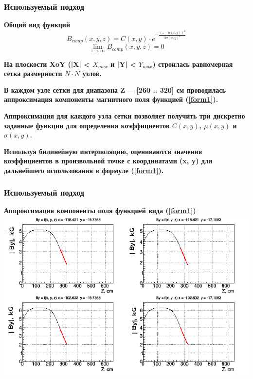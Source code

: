 \documentclass[svgnames] {beamer}
\begin{document}
\begin{frame}
  \frametitle{Используемый подход}
  \begin{block}{\centering \bf Общий вид функций}
    \begin{equation}
      B_{comp}(x, y, z) = C(x, y) \cdot e^{-\frac{(z - \mu(x,y))^{2}}{2 \sigma(x,y)^{2}}}
      \label{form1}
    \end{equation}
    \begin{equation}
      \lim_{z \to \infty} B_{comp}(x, y, z) = 0
      \label{form2}
    \end{equation}
  \end{block}
  \begin{block}{}
    \begin{enumerate}
      {\footnotesize \item \bf На плоскости XoY (|X| < $X_{max}$ и |Y| < $Y_{max}$) строилась равномерная сетка размерности $N \cdot N$ узлов.} 
      {\footnotesize \item \bf В каждом узле сетки для диапазона Z = [260 .. 320] см проводилась аппроксимация компоненты магнитного поля  функцией (\ref{form1}).}
      {\footnotesize \item \bf Аппроксимация для каждого узла сетки позволяет получить три дискретно заданные функции  для определения коэффициентов $C(x, y)$, $\mu(x, y)$ и $\sigma(x, y)$.}
      {\footnotesize \item \bf Используя билинейную интерполяцию, оцениваются значения коэффициентов в произвольной точке с координатами (x, y) 
        для дальнейшего использования в формуле (\ref{form1}).}
    \end{enumerate}
  \end{block}
\end{frame}

\begin{frame}
  \frametitle{Используемый подход}
  \begin{block}{\centering \bf Аппроксимация компоненты поля функцией вида (\ref{form1})}
    \centering \includegraphics[width=0.6\linewidth]{gauss_fitting.png}
  \end{block}
\end{frame}
\end{document}
